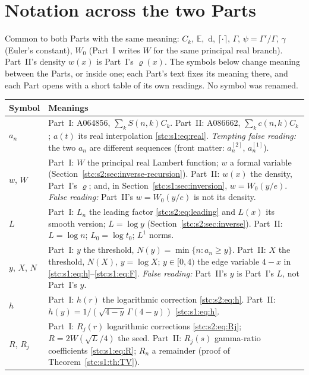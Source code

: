 \documentclass[11pt,letterpaper]{article}
\numberwithin{equation}{section}
\theoremstyle{remark}\newtheorem{remark}[theorem]{Remark}
\newcommand{\E}{\mathbb E}
\newcommand{\dd}{\,\mathrm d}
\begin{document}
\section*{Notation across the two Parts}\label{stc:sec:notation}
Common to both Parts with the same meaning: $C_k$, $\E$, $\dd$, $\lceil\cdot\rceil$, $\Gamma$, $\psi=\Gamma'/\Gamma$, $\gamma$ (Euler's constant), $W_0$ (Part~I writes $W$ for the same principal real branch). Part~II's density $w(x)$ is Part~I's $\varrho(x)$. The symbols below change meaning between the Parts, or inside one; each Part's text fixes its meaning there, and each Part opens with a short table of its own readings. No symbol was renamed.
\begingroup\small
\renewcommand{\theHtable}{notation.\arabic{table}}
\begin{longtable}{@{}>{\raggedright\arraybackslash}p{} >{\raggedright\arraybackslash}p{}@{}}
\toprule
Symbol & Meanings\\
\midrule
\endhead
$a_n$ & Part~I: A064856, $\sum_kS(n,k)C_k$. Part~II: A086662, $\sum_kc(n,k)C_k$; $a(t)$ its real interpolation \eqref{stc:s1:eq:real}. \emph{Tempting false reading:} the two $a_n$ are different sequences (front matter: $a^{[2]}_n$, $a^{[1]}_n$).\\
$w$, $W$ & Part~I: $W$ the principal real Lambert function; $w$ a formal variable (Section~\ref{stc:s2:sec:inverse-recursion}). Part~II: $w(x)$ the density, Part~I's $\varrho$; and, in Section~\ref{stc:s1:sec:inversion}, $w=W_0(y/e)$. \emph{False reading:} Part~II's $w=W_0(y/e)$ is not its density.\\
$L$ & Part~I: $L_n$ the leading factor \eqref{stc:s2:eq:leading} and $L(x)$ its smooth version; $L=\log y$ (Section~\ref{stc:s2:sec:inverse}). Part~II: $L=\log n$; $L_0=\log t_0$; $L^1$ norms.\\
$y$, $X$, $N$ & Part~I: $y$ the threshold, $N(y)=\min\{n:a_n\ge y\}$. Part~II: $X$ the threshold, $N(X)$, $y=\log X$; $y\in[0,4)$ the edge variable $4-x$ in \eqref{stc:s1:eq:h}--\eqref{stc:s1:eq:F}. \emph{False reading:} Part~II's $y$ is Part~I's $L$, not Part~I's $y$.\\
$h$ & Part~I: $h(r)$ the logarithmic correction \eqref{stc:s2:eq:h}. Part~II: $h(y)=1/(\sqrt{4-y}\,\Gamma(4-y))$ \eqref{stc:s1:eq:h}.\\
$R$, $R_j$ & Part~I: $R_j(r)$ logarithmic corrections \eqref{stc:s2:eq:Rj}; $R=2W(\sqrt L/4)$ the seed. Part~II: $R_j(s)$ gamma-ratio coefficients \eqref{stc:s1:eq:R}; $R_n$ a remainder (proof of Theorem~\ref{stc:s1:th:TV}).\\

\end{longtable}
\end{document}

